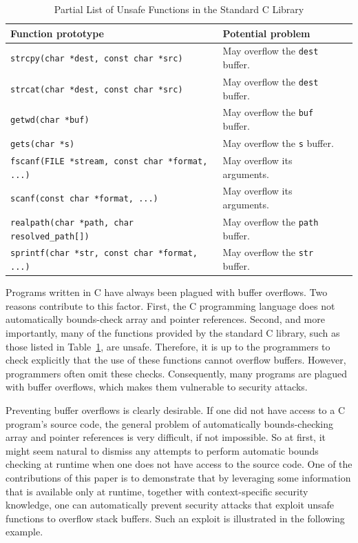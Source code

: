 \documentclass[]{article}
\begin{document}
\begin{table}[htbp]
\begin{center}
\caption{Partial List of Unsafe Functions in the Standard C Library}
\label{table:unsafe-functions}
\begin{tabular}{|l|l|l|} \hline
Function prototype	& Potential problem \\ \hline \hline

{\tt strcpy(char *dest, const char *src)} & May overflow the {\tt dest}
buffer. \\

{\tt strcat(char *dest, const char *src)} & May overflow the {\tt dest}
buffer. \\

{\tt getwd(char *buf)} & May overflow the {\tt buf} buffer. \\

{\tt gets(char *s)} & May overflow the {\tt s} buffer. \\

{\tt fscanf(FILE *stream, const char *format, ...)} & May overflow its
arguments. \\

{\tt scanf(const char *format, ...)} & May overflow its
arguments. \\

{\tt realpath(char *path, char resolved\_path[])} & May overflow the
{\tt path} buffer. \\

{\tt sprintf(char *str, const char *format, ...)} & May overflow the
{\tt str} buffer. \\

\hline
\end{tabular}
\end{center}
\end{table}

Programs written in C have always been plagued with buffer overflows.  Two
reasons contribute to this factor.  First, the C programming language does not
automatically bounds-check array and pointer references.  Second, and more
importantly, many of the functions provided by the standard C library, such as
those listed in Table~\ref{table:unsafe-functions}, are unsafe.  Therefore, it
is up to the programmers to check explicitly that the use of these functions
cannot overflow buffers.  However, programmers often omit these checks.
Consequently, many programs are plagued with buffer overflows, which makes them
vulnerable to security attacks.

Preventing buffer overflows is clearly desirable.  If one did not have
access to a C program's source code, the general problem of
automatically bounds-checking array and pointer references is very
difficult, if not impossible.  So at first, it might seem natural to
dismiss any attempts to perform automatic bounds checking at runtime
when one does not have access to the source code.  One of the
contributions of this paper is to demonstrate that by leveraging some
information that is available only at runtime, together with
context-specific security knowledge, one can automatically prevent
security attacks that exploit unsafe functions to overflow stack
buffers.  Such an exploit is illustrated in the following example.
\end{document}
